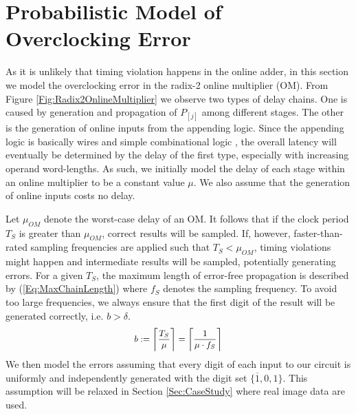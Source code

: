 \documentclass{acm_proc_article-sp}
\begin{document}
\section{Probabilistic Model of\\Overclocking Error}
As it is unlikely that timing violation happens in the online adder, in this section we model the overclocking error in the radix-2 online multiplier (OM). From Figure \ref{Fig:Radix2OnlineMultiplier} we observe two types of delay chains. One is caused by generation and propagation of $P_{[j]}$ among different stages. The other is the generation of online inputs from the appending logic. Since the appending logic is basically wires and simple combinational logic \cite{Online_Conversion}, the overall latency will eventually be determined by the delay of the first type, especially with increasing operand word-lengths. As such, we initially model the delay of each stage within an online multiplier to be a constant value $\mu$. We also assume that the generation of online inputs costs no delay.\vspace{-1ex}

Let $\mu_{OM}$ denote the worst-case delay of an OM. It follows that if the clock period $T_S$ is greater than $\mu_{OM}$, correct results will be sampled. If, however, faster-than-rated sampling frequencies are applied such that $T_S<\mu_{OM}$, timing violations might happen and intermediate results will be sampled, potentially generating errors. For a given $T_S$, the maximum length of error-free propagation is described by (\ref{Eq:MaxChainLength}) where $f_S$ denotes the sampling frequency. To avoid too large frequencies, we always ensure that the first digit of the result will be generated correctly, i.e. $b>\delta$.
%
\begin{eqnarray}\label{Eq:MaxChainLength}
\footnotesize
  b:=\left\lceil \frac{T_S}{\mu} \right\rceil=\left\lceil \frac{1}{\mu\cdot f_S}\right\rceil
\normalsize
\end{eqnarray}
%
We then model the errors assuming that every digit of each input to our circuit is uniformly and independently generated with the digit set $\{\overline{1},0,1\}$. This assumption will be relaxed in Section \ref{Sec:CaseStudy} where real image data are used.
\end{document}
